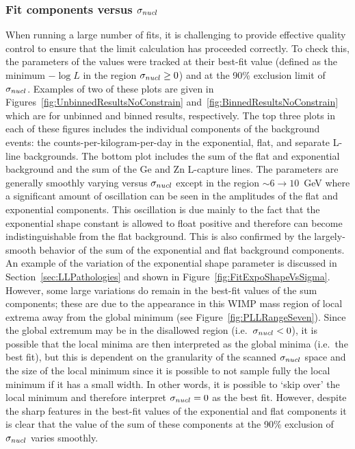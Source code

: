 			\subsubsection{Fit components versus $\sigma_{nucl}$}
When running a large number of fits, it is challenging to provide effective quality control to ensure that the limit calculation has proceeded correctly.  To check this, the parameters of the values were tracked at their best-fit value (defined as the minimum $-\log L$ in the region $\sigma_{nucl}\geq0$) and at the 90\% exclusion limit of $\sigma_{nucl}$.  Examples of two of these plots are given in Figures~\ref{fig:UnbinnedResultsNoConstrain} and~\ref{fig:BinnedResultsNoConstrain} which are for unbinned and binned results, respectively.  The top three plots in each of these figures includes the individual components of the background events: the counts-per-kilogram-per-day in the exponential, flat, and separate L-line backgrounds.  The bottom plot includes the sum of the flat and exponential background and the sum of the Ge and Zn L-capture lines.  The parameters are generally smoothly varying versus $\sigma_{nucl}$ except in the region $\sim6\to10$~GeV where a significant amount of oscillation can be seen in the amplitudes of the flat and exponential components.  This oscillation is due mainly to the fact that the exponential shape constant is allowed to float positive and therefore can become indistinguishable from the flat background.  This is also confirmed by the largely-smooth behavior of the sum of the exponential and flat background components.  An example of the variation of the exponential shape parameter is discussed in Section~\ref{sec:LLPathologies} and shown in Figure~\ref{fig:FitExpoShapeVsSigma}.  However, some large variations do remain in the best-fit values of the sum components; these are due to the appearance in this WIMP mass region of local extrema away from the global minimum (see Figure~\ref{fig:PLLRangeSeven}).  Since the global extremum may be in the disallowed region (i.e.~$\sigma_{nucl}<0$), it is possible that the local minima are then interpreted as the global minima (i.e.~the best fit), but this is dependent on the granularity of the scanned $\sigma_{nucl}$ space and the size of the local minimum since it is possible to not sample fully the local minimum if it has a small width.  In other words, it is possible to `skip over' the local minimum and therefore interpret $\sigma_{nucl}=0$ as the best fit.  However, despite the sharp features in the best-fit values of the exponential and flat components it is clear that the value of the sum of these components at the 90\% exclusion of $\sigma_{nucl}$ varies smoothly.  


